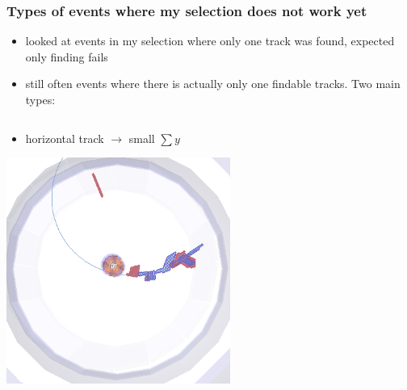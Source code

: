 \documentclass[18pt]{beamer}
\begin{document}
\begin{frame}
  \frametitle{Types of events where my selection does not work yet}
  \begin{itemize}
  \item looked at events in my selection where only one track was found, expected only finding fails
  \item still often events where there is actually only one findable tracks. Two main types:
  \end{itemize}
  \begin{columns}
    \begin{column}{0.5\textwidth}
      \begin{itemize}
      \item horizontal track $\rightarrow$ small $\sum y$
      \end{itemize}
      \begin{center}
      \includegraphics[width=0.55\textwidth]{figures/b2display_screenshots/gcr_data_2017-08_run3902_evt12895_false-finding-fail_1.png}
    \end{center}


\end{column}
\end{columns}
\end{frame}
\end{document}
